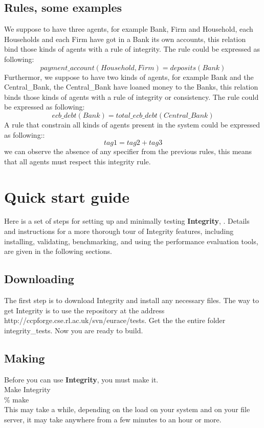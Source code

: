 \documentclass[a4paper,10pt]{article}
\begin{document}
\subsection{Rules, some examples}
We suppose to have three agents, for example Bank, Firm and Household,  each Households and each Firm have got in a Bank  its own accounts, this relation bind  those kinds of agents with a rule of integrity. 
The rule could be expressed as following:
\begin{equation}
payment \_ account(Household,Firm)=deposits(Bank)
\end{equation}
Furthermor, we suppose to have two kinds of agents, for example  Bank and the Central\_Bank,  the Central\_Bank  have loaned money to the Banks, this relation binds those kinds of agents with a rule of integrity or consistency. The rule could be expressed as following:
\begin{equation}
ecb\_debt(Bank) = total\_ecb\_debt(Central\_Bank)
\end{equation}
A rule that constrain all kinds of agents present in the system could be expressed as following::
\begin{equation}
tag1 = tag2+tag3
\end{equation}
we can observe the absence of any specifier from the previous rules, this means that all agents must respect this integrity rule. 
\section{Quick start guide}
Here is a set of steps for setting up and minimally testing \textbf{Integrity}, . Details and instructions for
a more thorough tour of Integrity features, including installing, validating, benchmarking,
and using the performance evaluation tools, are given in the following sections. 

\subsection{Downloading}
The first step is to download Integrity and install any necessary files.
The  way to get Integrity is to use the repository at the address  http://ccpforge.cse.rl.ac.uk/svn/eurace/tests. Get the the entire folder integrity\_tests.
Now you are ready to build.
\subsection{Making}
Before you can use \textbf{Integrity}, you must make it. \\
Make Integrity\\
\% make \\
This may take a while, depending on the load on your system and on your file server,
it may take anywhere from a few minutes to an hour or more.
\end{document}
